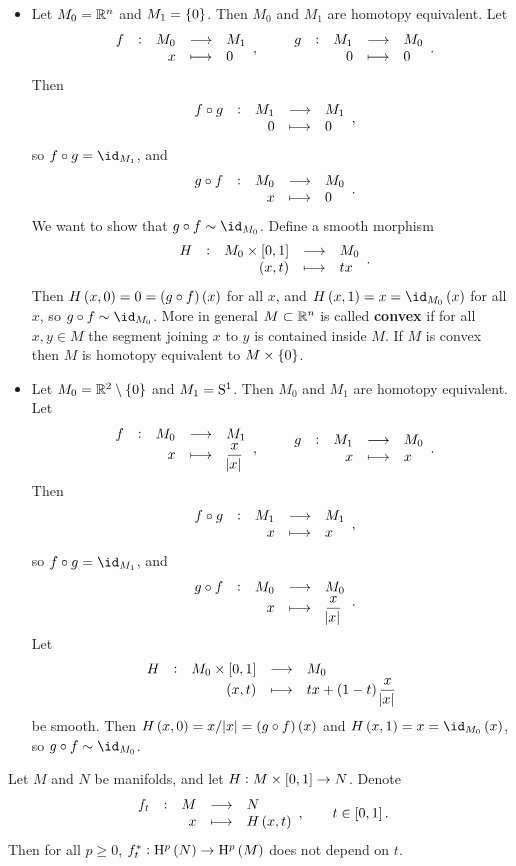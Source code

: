 \begin{example}
\hfill
\begin{itemize}
\item Let $ M_0 = \RR^n $ and $ M_1 = \cbr{0} $. Then $ M_0 $ and $ M_1 $ are homotopy equivalent. Let
$$ \function[f]{M_0}{M_1}{x}{0}, \qquad \function[g]{M_1}{M_0}{0}{0}. $$
Then
$$ \function[f \circ g]{M_1}{M_1}{0}{0}, $$
so $ f \circ g = \id_{M_1} $, and
$$ \function[g \circ f]{M_0}{M_0}{x}{0}. $$
We want to show that $ g \circ f \sim \id_{M_0} $. Define a smooth morphism
$$ \function[H]{M_0 \times \sbr{0, 1}}{M_0}{\br{x, t}}{tx}. $$
Then $ H\br{x, 0} = 0 = \br{g \circ f}\br{x} $ for all $ x $, and $ H\br{x, 1} = x = \id_{M_0}\br{x} $ for all $ x $, so $ g \circ f \sim \id_{M_0} $. More in general $ M \subset \RR^n $ is called \textbf{convex} if for all $ x, y \in M $ the segment joining $ x $ to $ y $ is contained inside $ M $. If $ M $ is convex then $ M $ is homotopy equivalent to $ M \times \cbr{0} $.

\pagebreak

\item Let $ M_0 = \RR^2 \setminus \cbr{0} $ and $ M_1 = \S^1 $. Then $ M_0 $ and $ M_1 $ are homotopy equivalent. Let
$$ \function[f]{M_0}{M_1}{x}{\dfrac{x}{\abs{x}}}, \qquad \function[g]{M_1}{M_0}{x}{x}. $$
Then
$$ \function[f \circ g]{M_1}{M_1}{x}{x}, $$
so $ f \circ g = \id_{M_1} $, and
$$ \function[g \circ f]{M_0}{M_0}{x}{\dfrac{x}{\abs{x}}}. $$
Let
$$ \function[H]{M_0 \times \sbr{0, 1}}{M_0}{\br{x, t}}{tx + \br{1 - t}\dfrac{x}{\abs{x}}} $$
be smooth. Then $ H\br{x, 0} = x / \abs{x} = \br{g \circ f}\br{x} $ and $ H\br{x, 1} = x = \id_{M_0}\br{x} $, so $ g \circ f \sim \id_{M_0} $.
\end{itemize}
\end{example}

\begin{proposition}
Let $ M $ and $ N $ be manifolds, and let $ H : M \times \sbr{0, 1} \to N $. Denote
$$ \function[f_t]{M}{N}{x}{H\br{x, t}}, \qquad t \in \sbr{0, 1}. $$
Then for all $ p \ge 0 $, $ f_t^* : \H^p\br{N} \to \H^p\br{M} $ does not depend on $ t $.
\end{proposition}


